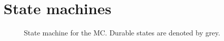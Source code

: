 \documentclass[a4paper,10pt]{article}
\begin{document}
\section{State machines}

\begin{figure}[p]
\begin{center}
{}
\end{center}
\caption{\label{figure:state_mach_mc}State machine for the MC. Durable states are denoted by grey.}
\end{figure}
\end{document}
